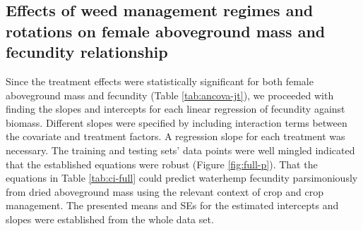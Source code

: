 \documentclass[
]{article}
\begin{document}
\hypertarget{effects-of-weed-management-regimes-and-rotations-on-female-aboveground-mass-and-fecundity-relationship}{%
\subsection*{Effects of weed management regimes and rotations on female aboveground mass and fecundity relationship}\label{effects-of-weed-management-regimes-and-rotations-on-female-aboveground-mass-and-fecundity-relationship}}

Since the treatment effects were statistically significant for both female aboveground mass and fecundity (Table \ref{tab:ancova-jt}), we proceeded with finding the slopes and intercepts for each linear regression of fecundity against biomass. Different slopes were specified by including interaction terms between the covariate and treatment factors. A regression slope for each treatment was necessary. The training and testing sets' data points were well mingled indicated that the established equations were robust (Figure \ref{fig:full-p}). That the equations in Table \ref{tab:ci-full} could predict waterhemp fecundity parsimoniously from dried aboveground mass using the relevant context of crop and crop management. The presented means and SEs for the estimated intercepts and slopes were established from the whole data set.
\end{document}
